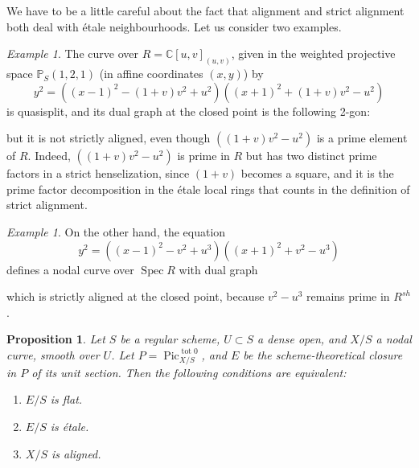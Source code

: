\documentclass[a4paper,10pt,twoside]{article}
\renewcommand{\P}{\mathbb{P}}
\newcommand{\C}{\mathbb{C}}
\newcommand{\on}[1]{\operatorname{#1}}
\DeclareMathOperator{\spec}{Spec}
\DeclareMathOperator{\pic}{Pic}
\newtheorem{prop}[thm]{Proposition}
\theoremstyle{definition}
\theoremstyle{remark}
\newtheorem{ex}[thm]{Example}
\renewcommand{\on}[1]{\operatorname{#1}}
\begin{document}
	We have to be a little careful about the fact that alignment and strict alignment both deal with étale neighbourhoods. Let us consider two examples.

\begin{ex} The curve over $R=\C[u,v]_{(u,v)}$, given in the weighted projective space $\P_S(1,2,1)$ (in affine coordinates $(x,y)$) by
\[
y^2=\left((x-1)^2-(1+v)v^2+u^2\right)\left((x+1)^2+(1+v)v^2-u^2\right)
\]
is quasisplit, and its dual graph at the closed point is the following 2-gon:

\begin{center}
\end{center}

but it is not strictly aligned, even though $((1+v)v^2-u^2)$ is a prime element of $R$. Indeed, $((1+v)v^2-u^2)$ is prime in $R$ but has two distinct prime factors in a strict henselization, since $(1+v)$ becomes a square, and it is the prime factor decomposition in the \'etale local rings that counts in the definition of strict alignment.
\end{ex}

\begin{ex} On the other hand, the equation
\[
y^2=\left((x-1)^2-v^2+u^3\right)\left((x+1)^2+v^2-u^3\right)
\]
defines a nodal curve over $\spec R$ with dual graph

\begin{center}
\end{center}

which is strictly aligned at the closed point, because $v^2-u^3$ remains prime in $R^{sh}$.
\end{ex}

\begin{prop}\label{alignement et platitude de E}
	Let $S$ be a regular scheme, $U\subset S$ a dense open, and $X/S$ a nodal curve, smooth over $U$. Let $P=\pic^{\on{tot}0}_{X/S}$, and $E$ be the scheme-theoretical closure in $P$ of its unit section. Then the following conditions are equivalent:
	
	\begin{enumerate}
		\item $E/S$ is flat.
		\item $E/S$ is \'etale.
		\item $X/S$ is aligned.
	\end{enumerate}
\end{prop}
\end{document}
